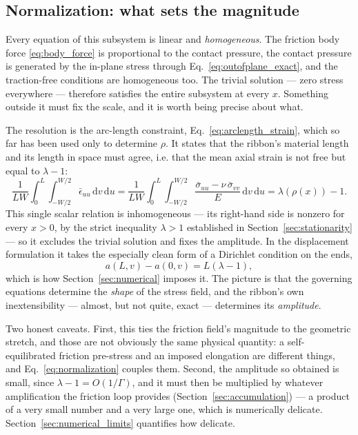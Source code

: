 \documentclass[11pt]{article}
\begin{document}
\subsection{Normalization: what sets the magnitude}\label{sec:normalization}
Every equation of this subsystem is linear and \emph{homogeneous}. The friction
body force \eqref{eq:body_force} is proportional to the contact pressure, the
contact pressure is generated by the in-plane stress through
Eq.~\eqref{eq:outofplane_exact}, and the traction-free conditions are homogeneous
too. The trivial solution --- zero stress everywhere --- therefore satisfies the
entire subsystem at every $x$. Something outside it must fix the scale, and it is
worth being precise about what.

The resolution is the arc-length constraint,
Eq.~\eqref{eq:arclength_strain}, which so far has been used only to determine
$\rho$. It states that the ribbon's material length and its length in space must
agree, i.e. that the mean axial strain is not free but equal to $\lambda - 1$:
\begin{equation}\label{eq:normalization}
    \boxed{\;\frac{1}{LW}\int_{0}^{L}\!\!\int_{-W/2}^{W/2}
      \bar\epsilon_{uu}\,\mathrm d v\,\mathrm d u
    = \frac{1}{LW}\int_{0}^{L}\!\!\int_{-W/2}^{W/2}
      \frac{\bar\sigma_{uu} - \nu\,\bar\sigma_{vv}}{E}\,
      \mathrm d v\,\mathrm d u
    = \lambda\!\left(\rho(x)\right) - 1.\;}
\end{equation}
This single scalar relation is inhomogeneous --- its right-hand side is nonzero
for every $x > 0$, by the strict inequality $\lambda > 1$ established in
Section~\ref{sec:stationarity} --- so it excludes the trivial solution and fixes
the amplitude. In the displacement formulation it takes the especially clean form
of a Dirichlet condition on the ends,
\begin{equation}\label{eq:elongation_bc}
    a(L,v) - a(0,v) = L\left(\lambda - 1\right),
\end{equation}
which is how Section~\ref{sec:numerical} imposes it. The picture is that the
governing equations determine the \emph{shape} of the stress field, and the
ribbon's own inextensibility --- almost, but not quite, exact --- determines its
\emph{amplitude}.

Two honest caveats. First, this ties the friction field's magnitude to the
geometric stretch, and those are not obviously the same physical quantity: a
self-equilibrated friction pre-stress and an imposed elongation are different
things, and Eq.~\eqref{eq:normalization} couples them. Second, the amplitude so
obtained is small, since $\lambda - 1 = O(1/\Gamma)$, and it must then be
multiplied by whatever amplification the friction loop provides
(Section~\ref{sec:accumulation}) --- a product of a very small number and a very
large one, which is numerically delicate. Section~\ref{sec:numerical_limits}
quantifies how delicate.
\end{document}
